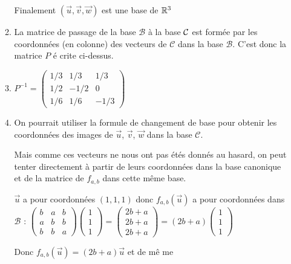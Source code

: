 \begin{correction}
\begin{enumerate}
\begin{enumerate}
Finalement $\left( \vec{u},\vec{v},\vec{w}\right) $ est une base de $\mathbb{%
R}^{3}$

\item La matrice de passage de la base $\mathcal{B}$ \`{a} la base $\mathcal{%
C}$ est form\'{e}e par les coordonn\'{e}es (en colonne) des vecteurs de $%
\mathcal{C}$ dans la base $\mathcal{B}.$ C'est donc la matrice $P$ \'{e}%
crite ci-dessus.

\item $P^{-1}=\left( 
\begin{array}{rrr}
1/3 & 1/3 & 1/3 \\ 
1/2 & -1/2 & 0 \\ 
1/6 & 1/6 & -1/3%
\end{array}
\right) $

\item On pourrait utiliser la formule de changement de base pour obtenir les
coordonn\'{e}es des images de $\vec{u}$, $\vec{v}$, $\vec{w}$ dans la base $%
\mathcal{C}.$

Mais comme ces vecteurs ne nous ont pas \'{e}t\'{e}s donn\'{e}s au hasard,
on peut tenter directement \`{a} partir de leurs coordonn\'{e}es dans la
base canonique et de la matrice de $f_{a,b}$ dans cette m\^{e}me base.

$\vec{u}$ a pour coordonn\'{e}es $\left( 1,1,1\right) $ donc $f_{a,b}\left( 
\vec{u}\right) $ a pour coordonn\'{e}es dans $\mathcal{B}$ : \newline
$\left( 
\begin{array}{rrr}
b & a & b \\ 
a & b & b \\ 
b & b & a%
\end{array}%
\right) \left( 
\begin{array}{c}
1 \\ 
1 \\ 
1%
\end{array}%
\right) =\allowbreak \left( 
\begin{array}{c}
2b+a \\ 
2b+a \\ 
2b+a%
\end{array}%
\right) =\left( 2b+a\right) \left( 
\begin{array}{c}
1 \\ 
1 \\ 
1%
\end{array}%
\right) $

Donc $f_{a,b}\left( \vec{u}\right) =\left( 2b+a\right) \vec{u}$ et de m\^{e}%
me


\end{enumerate}
\end{enumerate}
\end{correction}
